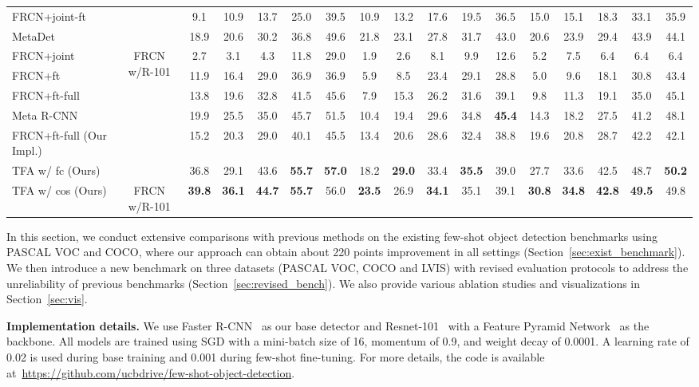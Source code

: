 \documentclass{article}
\newcommand{\model}{TFA\xspace}
\newcommand\minisection[1]{\vspace{1mm}\noindent \textbf{#1}}
\begin{document}
\begin{table*}[ht]
{\begin{tabular}{l|c|ccccc|ccccc|ccccc}
FRCN+joint-ft~\cite{wang2019meta} & & 9.1 & 10.9 & 
13.7 & 25.0 & 39.5 & 10.9 & 13.2 & 17.6 & 19.5 & 36.5 & 15.0 & 15.1 & 18.3 & 33.1 & 35.9 \\
MetaDet~\cite{wang2019meta} &  & 18.9 & 20.6 & 30.2 & 36.8 & 49.6 & 21.8 & 23.1 & 27.8 & 31.7 & 43.0 & 20.6 & 23.9 & 29.4 & 43.9 & 44.1 \\ \midrule
FRCN+joint~\cite{yan2019meta} & \multirow{4}{*}{FRCN w/R-101} & 2.7 & 3.1 & 4.3 & 11.8 & 29.0 & 1.9 & 2.6 & 8.1 & 9.9 & 12.6 & 5.2 & 7.5 & 6.4 & 6.4 & 6.4 \\
FRCN+ft~\cite{yan2019meta} &  & 11.9 & 16.4 & 
29.0 & 36.9 & 36.9 & 5.9 & 8.5 & 23.4 & 29.1 & 28.8 & 5.0 & 9.6 & 18.1 & 30.8 & 43.4 \\
FRCN+ft-full~\cite{yan2019meta} &  & 13.8 & 19.6 
& 32.8 & 41.5 & 45.6 & 7.9 & 15.3 & 26.2 & 31.6 & 39.1 & 9.8 & 11.3 & 19.1 & 35.0 & 45.1 \\
Meta R-CNN~\cite{yan2019meta} &  & 19.9 & 25.5 & 35.0 & 45.7 & 51.5 & 10.4 & 19.4 & 29.6 & 34.8 & \textbf{45.4} & 14.3 & 18.2 & 27.5 & 41.2 & 48.1 \\ \midrule
FRCN+ft-full (Our Impl.) &  & 15.2 & 20.3 & 29.0 & 40.1 & 45.5 & 13.4 & 20.6 & 28.6 & 32.4 & 38.8 & 19.6 & 20.8 & 28.7 & 42.2 & 42.1 \\
\rowcolor{Gray} \model w/ fc (Ours) &  & 36.8 & 29.1 & 43.6 & \textbf{55.7} & \textbf{57.0} & 18.2 & \textbf{29.0} & 33.4 & \textbf{35.5} & 39.0 & 27.7 & 33.6 & 42.5 & 48.7 & \textbf{50.2} \\
\rowcolor{Gray} \model w/ cos (Ours) & \multirow{-3}{*}{FRCN w/R-101} & \textbf{39.8} & \textbf{36.1} & \textbf{44.7} & \textbf{55.7} & 56.0 & \textbf{23.5} & 26.9 & \textbf{34.1} & 35.1 & 39.1 & \textbf{30.8} & \textbf{34.8} & \textbf{42.8} & \textbf{49.5} & 49.8 \\
\bottomrule
\end{tabular}}
\label{tab:main_voc}
\end{table*}
In this section, we conduct extensive comparisons with previous methods on the existing 
few-shot object detection benchmarks using PASCAL VOC and COCO, where our approach can obtain
about 220 points improvement in all settings (Section~\ref{sec:exist_benchmark}). We then introduce a new benchmark on three datasets (PASCAL VOC, COCO and LVIS) with revised evaluation protocols to address the unreliability of previous benchmarks (Section~\ref{sec:revised_bench}). We also provide various ablation studies and visualizations in Section~\ref{sec:vis}. 

\minisection{Implementation details.}
We use Faster R-CNN~\cite{ren2015faster} as our base detector and Resnet-101~\cite{he2016deep} with a Feature Pyramid Network~\cite{lin2016feature} as the backbone.
All models are trained using SGD with a mini-batch size of 16, momentum of 0.9, and weight decay of 0.0001.
A learning rate of 0.02 is used during base training and 0.001 during few-shot fine-tuning.
For more details, the code is available at~\url{https://github.com/ucbdrive/few-shot-object-detection}.
\end{document}
